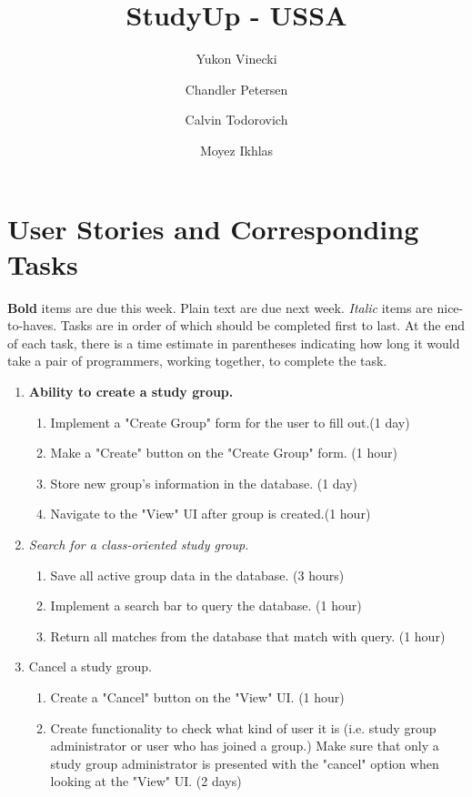 \documentclass[12pt,letterpaper]{article}
\title{StudyUp - USSA}
\author[1]{Yukon Vinecki}
\author[2]{Chandler Petersen}
\author[3]{Calvin Todorovich}
\author[4]{Moyez Ikhlas}
\affil[1]{vineckiy, EECS - Oregon State University}
\affil[2]{petercha, EECS - Oregon State University}
\affil[3]{todorovc, EECS - Oregon State University}
\affil[4]{ikhlasm, EECS - Oregon State University}
\begin{document}
\maketitle
\clearpage
\tableofcontents
\clearpage
{}

\section{User Stories and Corresponding Tasks}
\textbf{Bold} items are due this week. Plain text are due next week. \textit{Italic} items are nice-to-haves. Tasks are in order of which should be completed first to last. At the end of each task, there is a time estimate in parentheses indicating how long it would take a pair of programmers, working together, to complete the task.
\begin{enumerate}
\item \textbf{Ability to create a study group.}
	\begin{enumerate}
	\item Implement a "Create Group" form for the user to fill out.(1 day)
    \item Make a "Create" button on the "Create Group" form. (1 hour)
    \item Store new group's information in the database. (1 day)
    \item Navigate to the "View" UI after group is created.(1 hour)
	\end{enumerate}
\item \textit{Search for a class-oriented study group.}
	\begin{enumerate}
	\item Save all active group data in the database. (3 hours)
    \item Implement a search bar to query the database. (1 hour)
    \item Return all matches from the database that match with query. (1 hour)
	\end{enumerate}
\item Cancel a study group.
	\begin{enumerate}
	\item Create a "Cancel" button on the "View" UI. (1 hour)
    \item Create functionality to check what kind of user it is (i.e. study group administrator or user who has joined a group.) Make sure that only a study group administrator is presented with the "cancel" option when looking at the "View" UI. (2 days)
    

\end{enumerate}
\end{enumerate}
\end{document}

